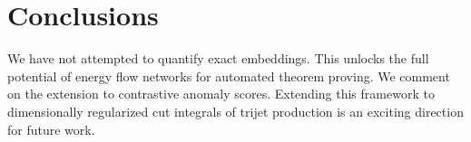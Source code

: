\section{Conclusions}\label{sec:conclusions}

We have not attempted to quantify exact embeddings. This unlocks the
full potential of energy flow networks for automated theorem proving. We
comment on the extension to contrastive anomaly scores. Extending this
framework to dimensionally regularized cut integrals of trijet
production is an exciting direction for future work.

